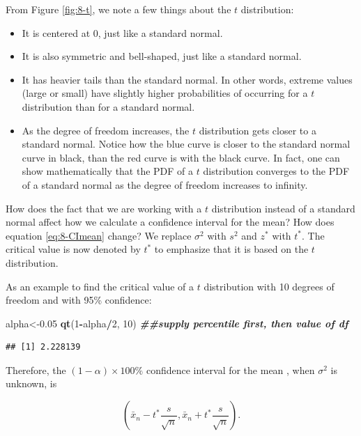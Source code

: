 \documentclass[
]{book}
\newenvironment{Shaded}{\begin{snugshade}}{\end{snugshade}}
\newcommand{\DecValTok}[1]{\textcolor[rgb]{0.00,0.00,0.81}{#1}}
\newcommand{\DocumentationTok}[1]{\textcolor[rgb]{0.56,0.35,0.01}{\textbf{\textit{#1}}}}
\newcommand{\FloatTok}[1]{\textcolor[rgb]{0.00,0.00,0.81}{#1}}
\newcommand{\FunctionTok}[1]{\textcolor[rgb]{0.13,0.29,0.53}{\textbf{#1}}}
\newcommand{\NormalTok}[1]{#1}
\newcommand{\OtherTok}[1]{\textcolor[rgb]{0.56,0.35,0.01}{#1}}
\newcommand{\SpecialCharTok}[1]{\textcolor[rgb]{0.81,0.36,0.00}{\textbf{#1}}}
\providecommand{\tightlist}{%
  \setlength{\itemsep}{0pt}\setlength{\parskip}{0pt}}
\theoremstyle{definition}
\theoremstyle{definition}
\theoremstyle{definition}
\theoremstyle{definition}
\theoremstyle{remark}
\begin{document}
From Figure \ref{fig:8-t}, we note a few things about the \(t\) distribution:

\begin{itemize}
\tightlist
\item
  It is centered at 0, just like a standard normal.
\item
  It is also symmetric and bell-shaped, just like a standard normal.
\item
  It has heavier tails than the standard normal. In other words, extreme values (large or small) have slightly higher probabilities of occurring for a \(t\) distribution than for a standard normal.
\item
  As the degree of freedom increases, the \(t\) distribution gets closer to a standard normal. Notice how the blue curve is closer to the standard normal curve in black, than the red curve is with the black curve. In fact, one can show mathematically that the PDF of a \(t\) distribution converges to the PDF of a standard normal as the degree of freedom increases to infinity.
\end{itemize}

How does the fact that we are working with a \(t\) distribution instead of a standard normal affect how we calculate a confidence interval for the mean? How does equation \eqref{eq:8-CImean} change? We replace \(\sigma^2\) with \(s^2\) and \(z^*\) with \(t^*\). The critical value is now denoted by \(t^*\) to emphasize that it is based on the \(t\) distribution.

As an example to find the critical value of a \(t\) distribution with 10 degrees of freedom and with 95\% confidence:

\begin{Shaded}
\begin{Highlighting}[]
\NormalTok{alpha}\OtherTok{\textless{}{-}}\FloatTok{0.05}
\FunctionTok{qt}\NormalTok{(}\DecValTok{1}\SpecialCharTok{{-}}\NormalTok{alpha}\SpecialCharTok{/}\DecValTok{2}\NormalTok{, }\DecValTok{10}\NormalTok{) }\DocumentationTok{\#\#supply percentile first, then value of df}
\end{Highlighting}
\end{Shaded}

\begin{verbatim}
## [1] 2.228139
\end{verbatim}

Therefore, the \((1-\alpha) \times 100\%\) confidence interval for the mean , when \(\sigma^2\) is unknown, is

\begin{equation} 
\left( \bar{x}_n - t^{*} \frac{s}{\sqrt{n}}, \bar{x}_n + t^{*} \frac{s}{\sqrt{n}} \right).
\label{eq:8-CImeant}
\end{equation}
\end{document}
